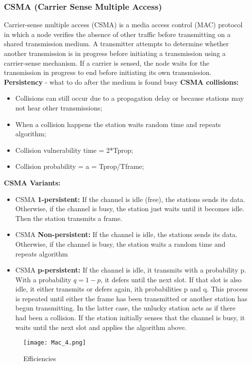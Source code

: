 \documentclass[../resumosRCOM.tex]{subfiles}
\begin{document}
\subsubsection{CSMA (Carrier Sense Multiple Access)}
Carrier-sense multiple access (CSMA) is a media access control (MAC) protocol in which a node verifies the absence of other traffic before transmitting on a shared transmission medium.
\newline
A transmitter attempts to determine whether another transmission is in progress before initiating a transmission using a carrier-sense mechanism. If a carrier is sensed, the node waits for the transmission in progress to end before initiating its own transmission.
\newline
\textbf{Persistency} - what to do after the medium is found busy
\newline
\newline
\textbf{CSMA collisions:}
\begin{itemize}
        \item Collisions can still occur due to a propagation delay or because stations may not hear other transmissions;
        \item When a collision happens the station waits random time and repeats algorithm;
        \item Collision vulnerability time = 2*Tprop;
        \item Collision probability = a = Tprop/Tframe;
\end{itemize}
\textbf{CSMA Variants:}
\begin{itemize}
        \item CSMA \textbf {1-persistent:} If the channel is idle (free), the stations sends its data. Otherwise, if the channel is busy, the station just waits until it becomes idle. Then the station transmits a frame.
        \item CSMA \textbf {Non-persistent:} If the channel is idle, the stations sends its data. Otherwise, if the channel is busy, the station waits a random time and repeats algorithm
        \item CSMA \textbf {p-persistent:} If the channel is idle, it transmits 
        with a probability p. With a probability $q = 1 - p$, it defers until the 
        next slot. If that slot is also idle, it either transmits or defers again, 
        ith probabilities p and q. This process is repeated until either the frame 
        has been transmitted or another station has begun transmitting. In the latter 
        case, the unlucky station acts as if there had been a collision. If the station
         initially senses that the channel is busy, it waits until the next slot and 
         applies the algorithm above.
\end{itemize}
\begin{figure}[H]
    \centering
    \texttt{[image: Mac\_4.png]}
    \caption{Efficiencies}
\end{figure}
\end{document}
